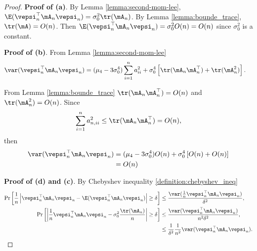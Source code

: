 \documentclass[english,12pt]{book}\usepackage[]{graphicx}\usepackage[]{xcolor}
\begin{document}
\begin{proof}
\textbf{Proof of (a)}. By Lemma \ref{lemma:second-mom-lee}, $\E(\vepsi_n^\top\mA_n\vepsi_n) = \sigma_{0}^2\tr(\mA_n)$. By Lemma \ref{lemma:bounde_trace}, $\tr(\mA) = O(n)$. Then $\E(\vepsi_n^\top\mA_n\vepsi_n) = \sigma_{0}^2 O(n) = O(n)$ since $\sigma_{0}^2$ is a constant. 

\textbf{Proof of (b)}. From Lemma \ref{lemma:second-mom-lee}
\begin{equation*}
\begin{aligned}
  \var(\vepsi_n^\top\mA_n\vepsi_n) & = (\mu_4 - 3\sigma^4_0)\sum_{i = 1}^na_{ii}^2+\sigma^4_0\left[\tr(\mA_n\mA_n^\top)+\tr(\mA^2_n)\right].
\end{aligned}
\end{equation*}

From Lemma \ref{lemma:bounde_trace} $\tr(\mA_n\mA_n^\top) = O(n)$ and $\tr(\mA_n^2) = O(n)$. Since 
\begin{equation*}
  \sum_{i = 1}^n a_{n, ii}^2 \leq \tr(\mA_n\mA_n^\top) = O(n), 
\end{equation*}
%
then 
\begin{equation*}
\begin{aligned}
  \var(\vepsi_n^\top\mA_n\vepsi_n) & = (\mu_4 - 3\sigma^4_0)O(n)+\sigma^4_0\left[O(n)+ O(n)\right] \\
  & = O(n)
\end{aligned}
\end{equation*}

\textbf{Proof of (d) and (c)}. By Chebyshev inequality \ref{definition:chebyshev_ineq}
 \begin{equation*}
 \begin{aligned}
  \Pr\left[\frac{1}{n}\left|\vepsi_n^\top \mA_n \vepsi_n - \E(\vepsi_n^\top \mA_n \vepsi_n)\right| \geq \delta \right] &\leq \frac{\var(\frac{1}{n}\vepsi_n^\top \mA_n \vepsi_n)}{\delta^2}, \\
    \Pr\left[\left|\frac{1}{n}\vepsi_n^\top \mA_n \vepsi_n - \sigma^2_{0}\frac{\tr(\mA_n)}{n}\right|  \geq \delta \right] &\leq \frac{\var(\vepsi_n^\top \mA_n \vepsi_n)}{n^2\delta^2},  \\
    & \leq \frac{1}{\delta^2}\frac{1}{n^2}\var(\vepsi_n^\top \mA_n \vepsi_n).
 \end{aligned}
 \end{equation*}


\end{proof}
\end{document}
